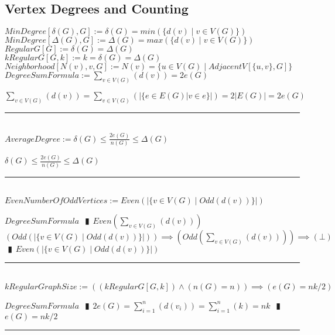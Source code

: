\documentclass{book}
\newcommand{\abr}{:=}
\newcommand{\pipe}{$\phantom{(}\vrectangleblack\phantom{)}$}
\newcommand{\pr}[1]{\left(#1\right)}
\newcommand{\st}{\mathbin{|}}
\newcommand{\utup}[1]{\{#1\}}
\begin{document}
\subsection{Vertex Degrees and Counting}
$MinDegree[\delta(G), G] \abr \delta(G) = min\pr{\{d(v) \st v \in V(G)\}}$ \\
$MinDegree[\Delta(G), G] \abr \Delta(G) = max\pr{\{d(v) \st v \in V(G)\}}$ \\
$RegularG[G] \abr \delta(G) = \Delta(G)$ \\
$kRegularG[G, k] \abr k = \delta(G) = \Delta(G)$ \\
$Neighborhood[N(v), v, G] \abr N(v) = \{u \in V(G) \st AdjacentV[\utup{u, v}, G]\}$ \\

$DegreeSumFormula \abr \sum \limits_{v \in V(G)}\pr{d(v)} = 2 e(G)$
\begin{enumerate}
  \lit $\sum \limits_{v \in V(G)}\pr{d(v)} = \sum \limits_{v \in V(G)}\pr{|\{e \in E(G) | v \in e\}|} = 2 |E(G)| = 2 e(G)$
\end{enumerate} \vspace{.75mm} \hrule \vspace{.75mm} \ \\ 

$AverageDegree \abr \delta(G) \leq \frac{2 e(G)}{n(G)} \leq \Delta(G)$
\begin{enumerate}
  \lit$ \delta(G) \leq \frac{2 e(G)}{n(G)} \leq \Delta(G)$
\end{enumerate} \vspace{.75mm} \hrule \vspace{.75mm} \ \\ 

$EvenNumberOfOddVertices \abr Even\pr{|\{v \in V(G) \st Odd\pr{d(v)}\}|}$
\begin{enumerate}
  \lit $DegreeSumFormula$ \pipe $Even\pr{\sum \limits_{v \in V(G)}\pr{d(v)}}$
  \lit $\pr{Odd\pr{|\{v \in V(G) \st Odd\pr{d(v)}\}|}} \implies \pr{Odd\pr{\sum \limits_{v \in V(G)}\pr{d(v)}}} \implies (\bot)$ \pipe $Even\pr{|\{v \in V(G) \st Odd\pr{d(v)}\}|}$
\end{enumerate} \vspace{.75mm} \hrule \vspace{.75mm} \ \\ 

$kRegularGraphSize \abr \pr{(kRegularG[G, k]) \land \pr{n(G) = n}} \implies \pr{e(G) = n k / 2}$
\begin{enumerate}
  \lit $DegreeSumFormula$ \pipe $2 e(G) = \sum \limits_{i = 1}^{n}\pr{d(v_i)} = \sum \limits_{i = 1}^{n}(k) = n k$ \pipe $e(G) = n k / 2$
\end{enumerate} \vspace{.75mm} \hrule \vspace{.75mm} \ \\ 
\end{document}
